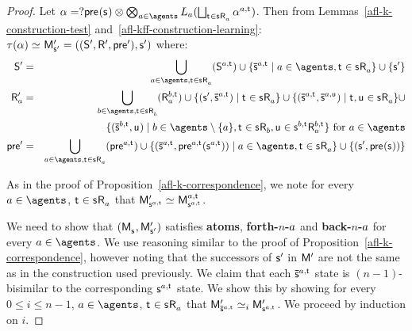 \begin{proof}
Let $\alpha = \test{\aPrecondition(\aStateS)} \compose \bigcompose_{\agentA \in \agents} \learns_\agentA (\bigchoice_{\aStateT \in \aStateS \aAccessibility{\agentA}} \alpha^{\agentA,\aStateT})$. 
Then from Lemmas~\ref{afl-k-construction-test} and~\ref{afl-kff-construction-learning}: $\tau(\alpha) \bisimilar \aPModelP{\aStateSP} = \aPModelTupleP{\aStateSP}$ where:
\begin{eqnarray*}
    \aStatesP &=& \bigcup_{\agentA \in \agents, \aStateT \in \aStateS \aAccessibility{\agentA}} (\aStates[\agentA,\aStateT]) \cup \{\aPStateS[\agentA,\aStateT] \mid \agentA \in \agents, \aStateT \in \aStateS \aAccessibility{\agentA}\} \cup \{\aStateSP\}\\
    \aAccessibilityP{\agentA} &=& \bigcup_{\agentB \in \agents, \aStateT \in \aStateS \aAccessibility{\agentB}} (\aAccessibility[\agentB,\aStateT]{\agentA}) \cup \{(\aStateSP, \aPStateS[\agentA, \aStateT]) \mid \aStateT \in \aStateS \aAccessibility{\agentA}\} \cup \{(\aPStateS[\agentA, \aStateT], \aPStateS[\agentA, \aStateU]) \mid \aStateT, \aStateU \in \aStateS \aAccessibility{\agentA}\} \cup\\
                                               &&\hspace{45pt}\{(\aPStateS[\agentB, \aStateT], \aStateU) \mid \agentB \in \agents \setminus \{\agentA\}, \aStateT \in \aStateS \aAccessibility{\agentB}, \aStateU \in \aStateS[\agentB,\aStateT] \aAccessibility[\agentB,\aStateT]{\agentA}\} \text{ for } \agentA \in \agents\\
    \aPreconditionP &=& \bigcup_{\agentA \in \agents, \aStateT \in \aStateS \aAccessibility{\agentA}} (\aPrecondition[\agentA,\aStateT]) \cup \{(\aPStateS[\agentA, \aStateT], \aPrecondition[\agentA,\aStateT](\aStateS[\agentA,\aStateT])) \mid \agentA \in \agents, \aStateT \in \aStateS \aAccessibility{\agentA}\} \cup \{(\aStateSP, \aPrecondition(\aStateS))\}
\end{eqnarray*}

As in the proof of Proposition~\ref{afl-k-correspondence}, we note for every $\agentA \in \agents$, $\aStateT \in \aStateS \aAccessibility{\agentA}$ that $\aPModelP{\aStateS[\agentA,\aStateT]} \bisimilar \aPModel[\agentA,\aStateT]{\aStateS[\agentA,\aStateT]}$.

We need to show that $(\aPModel{\aStateS}, \aPModelP{\aStateSP})$ satisfies {\bf atoms}, {\bf forth-$n$-$a$} and {\bf back-$n$-$a$} for every $\agentA \in \agents$.
We use reasoning similar to the proof of Proposition~\ref{afl-k-correspondence}, however noting that the successors of ${\mathsf{{s}}^{\prime}}$ in ${\mathsf{M}^{\prime}}$ are not the same as in the construction used previously.
We claim that each $\aPStateS[\agentA,\aStateT]$ state is $(n-1)$-bisimilar to the corresponding $\aStateS[\agentA,\aStateT]$ state.
We show this by showing for every $0 \leq i \leq n - 1$, $\agentA \in \agents$, $\aStateT \in \aStateS \aAccessibility{\agentA}$ that $\aPModelP{\aPStateS[\agentA,\aStateT]} \bisimilar[i] \aPModelP{\aStateS[\agentA,\aStateT]}$.
We proceed by induction on $i$.


\end{proof}
